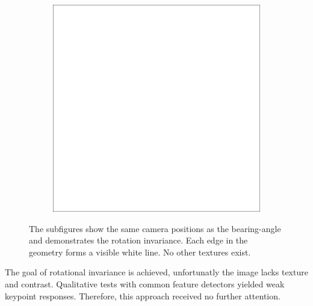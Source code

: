 \begin{figure}[H]
\begin{subfigure}[t]{0.32\textwidth}
    \end{subfigure}
    \begin{subfigure}[t]{0.32\textwidth}
        \includegraphics[width=\linewidth]{chapter04/img/max-0210.png}
    \end{subfigure}
    \caption{The subfigures show the same camera positions as the \gls{bearing-angle} and demonstrates the rotation invariance. Each edge in the geometry forms a visible white line. No other textures exist.}\label{fig:max-curve-images}
\end{figure}
The goal of rotational invariance is achieved, unfortunatly the image lacks texture and contrast.
Qualitative tests with common feature detectors yielded weak keypoint responses.
Therefore, this approach received no further attention.
